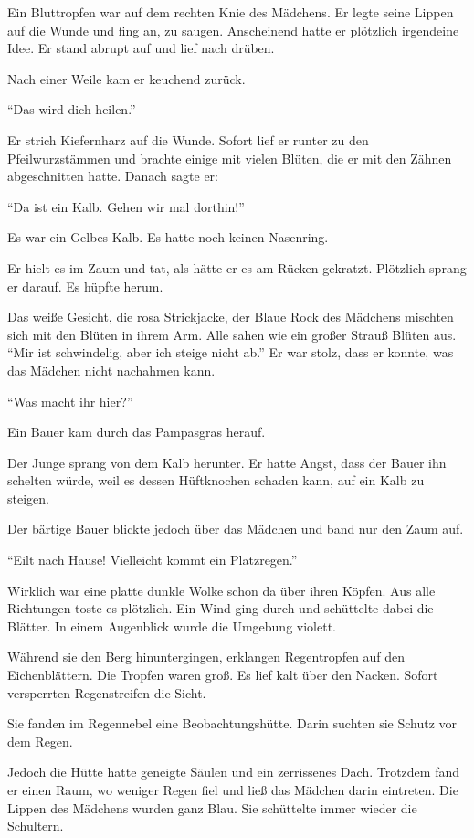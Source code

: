 \documentclass[prd,a4paper,12pt,tightenlines,notitlepage,nofootinbib]{revtex4-1}
\begin{document}
Ein Bluttropfen war auf
dem rechten Knie des Mädchens.  Er legte seine Lippen auf die Wunde und fing an,
zu saugen.  Anscheinend hatte er plötzlich irgendeine Idee.  Er stand abrupt auf
und lief nach drüben.

Nach einer Weile kam er keuchend zurück.

"`Das wird dich heilen."'

Er strich Kiefernharz auf die Wunde.  Sofort
lief er runter zu den Pfeilwurzstämmen und brachte einige mit vielen
Blüten, die er mit den Zähnen abgeschnitten hatte.  Danach sagte er:

"`Da ist ein Kalb. Gehen wir mal dorthin!"'

Es war ein Gelbes Kalb.  Es hatte noch keinen
Nasenring.

Er hielt es im Zaum und tat, als hätte er es am Rücken
gekratzt.  Plötzlich sprang er darauf.  Es hüpfte herum.

Das weiße Gesicht, die rosa Strickjacke, der Blaue Rock des
Mädchens mischten sich mit den Blüten in ihrem Arm.  Alle sahen wie
ein großer Strauß Blüten aus.  "`Mir ist schwindelig, aber ich steige nicht
ab."'  Er war stolz, dass er konnte, was das Mädchen nicht nachahmen kann.

"`Was macht ihr hier?"'

Ein Bauer kam durch das Pampasgras herauf.

Der
Junge sprang von dem Kalb herunter.  Er hatte Angst, dass der Bauer ihn schelten
würde, weil es dessen Hüftknochen schaden kann, auf ein Kalb zu steigen.

Der
bärtige Bauer blickte jedoch über das Mädchen und band nur den Zaum
auf.

"`Eilt nach Hause!  Vielleicht kommt ein Platzregen."'

Wirklich
war eine platte dunkle Wolke schon da über ihren Köpfen. Aus alle
Richtungen toste es plötzlich.  Ein Wind ging durch und
schüttelte dabei die Blätter.  In einem Augenblick wurde die Umgebung violett.

Während sie den Berg hinuntergingen, erklangen Regentropfen
auf den Eichenblättern.
Die Tropfen waren groß.  Es lief kalt über den Nacken. %
Sofort versperrten Regenstreifen die Sicht.

Sie fanden im
Regennebel eine Beobachtungshütte.  Darin suchten sie Schutz vor dem Regen.

Jedoch die Hütte hatte geneigte Säulen und ein zerrissenes
Dach.  Trotzdem fand er einen Raum, wo weniger Regen fiel und ließ das Mädchen
darin eintreten.  Die Lippen des Mädchens wurden ganz Blau.
Sie schüttelte immer wieder die Schultern.
\end{document}
